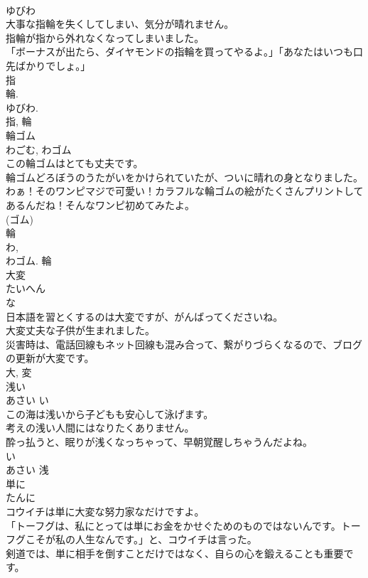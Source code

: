 \documentclass[8pt]{extreport}
\begin{document}
\begin{CJK}{UTF8}{min}
\\	ゆびわ	
\\	大事な指輪を失くしてしまい、気分が晴れません。	
\\	指輪が指から外れなくなってしまいました。	
\\	「ボーナスが出たら、ダイヤモンドの指輪を買ってやるよ。」「あなたはいつも口先ばかりでしょ。」	
\\	指 
\\	輪. 
\\	ゆびわ.
\\	指, 輪	
\\	輪ゴム	
\\	わごむ, わゴム	
\\	この輪ゴムはとても丈夫です。	
\\	輪ゴムどろぼうのうたがいをかけられていたが、ついに晴れの身となりました。	
\\	わぁ！そのワンピマジで可愛い！カラフルな輪ゴムの絵がたくさんプリントしてあるんだね！そんなワンピ初めてみたよ。	
\\	(ゴム) 
\\	輪 
\\	わ, 
\\	わゴム.	輪	
\\	大変	
\\	たいへん	
\\	な 
\\	日本語を習とくするのは大変ですが、がんばってくださいね。	
\\	大変丈夫な子供が生まれました。	
\\	災害時は、電話回線もネット回線も混み合って、繋がりづらくなるので、ブログの更新が大変です。	
\\	大, 変	
\\	浅い	
\\	あさい	い 
\\	この海は浅いから子どもも安心して泳げます。	
\\	考えの浅い人間にはなりたくありません。	
\\	酔っ払うと、眠りが浅くなっちゃって、早朝覚醒しちゃうんだよね。	
\\	い 
\\	あさい	浅	
\\	単に	
\\	たんに	
\\	コウイチは単に大変な努力家なだけですよ。	
\\	「トーフグは、私にとっては単にお金をかせぐためのものではないんです。トーフグこそが私の人生なんです。」と、コウイチは言った。	
\\	剣道では、単に相手を倒すことだけではなく、自らの心を鍛えることも重要です。	

\end{CJK}
\end{document}
